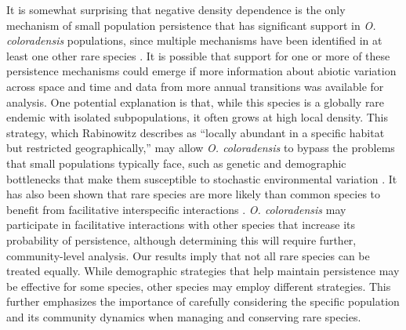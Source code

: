 \documentclass[12pt, letterpaper]{article}
\begin{document}
It is somewhat surprising that negative density dependence is the only mechanism of small population persistence that has significant support in \textit{O. coloradensis} populations, since multiple mechanisms have been identified in at least one other rare species \cite{Dibner2019}. It is possible that support for one or more of these persistence mechanisms could emerge if more information about abiotic variation across space and time and data from more annual transitions was available for analysis. One potential explanation is that, while this species is a globally rare endemic with isolated subpopulations, it often grows at high local density. This strategy, which Rabinowitz describes as “locally abundant in a specific habitat but restricted geographically,” may allow \textit{O. coloradensis} to bypass the problems that small populations typically face, such as genetic and demographic bottlenecks that make them susceptible to stochastic environmental variation \cite{Rabinowitz1981SevenRarity}. It has also been shown that rare species are more likely than common species to benefit from facilitative interspecific interactions \cite{Calatayud2020PositiveAssemblages}. \textit{O. coloradensis} may participate in facilitative interactions with other species that increase its probability of persistence, although determining this will require further, community-level analysis. Our results imply that not all rare species can be treated equally. While demographic strategies that help maintain persistence may be effective for some species, other species may employ different strategies. This further emphasizes the importance of carefully considering the specific population and its community dynamics when managing and conserving rare species.  

\end{document}
